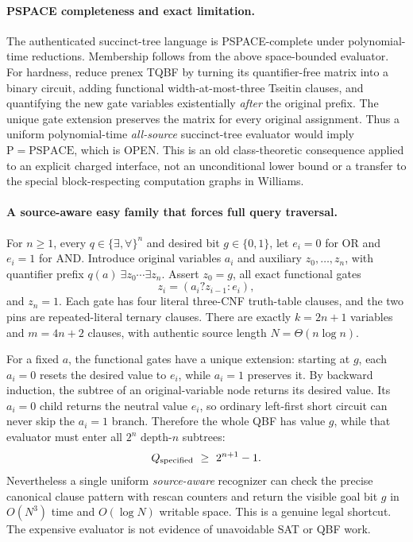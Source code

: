 \documentclass[11pt]{article}
\begin{document}
\paragraph{PSPACE completeness and exact limitation.}
The authenticated succinct-tree language is PSPACE-complete under
polynomial-time reductions. Membership follows from the above
space-bounded evaluator. For hardness, reduce prenex TQBF by turning
its quantifier-free matrix into a binary circuit, adding functional
width-at-most-three Tseitin clauses, and quantifying the new gate
variables existentially \emph{after} the original prefix. The unique
gate extension preserves the matrix for every original assignment.
Thus a uniform polynomial-time \emph{all-source} succinct-tree
evaluator would imply $\mathrm P=\mathrm{PSPACE}$, which is OPEN.
This is an old class-theoretic consequence applied to an explicit
charged interface, not an unconditional lower bound or a transfer
to the special block-respecting computation graphs in Williams.

\paragraph{A source-aware easy family that forces full query traversal.}
For $n\ge1$, every $q\in\{\exists,\forall\}^n$ and desired bit
$g\in\{0,1\}$, let $e_i=0$ for OR and $e_i=1$ for AND. Introduce
original variables $a_i$ and auxiliary $z_0,\ldots,z_n$, with
quantifier prefix $q(a)\ \exists z_0\cdots\exists z_n$.
Assert $z_0=g$, all exact functional gates
\[
  z_i=(a_i?z_{i-1}:e_i),
\]
and $z_n=1$. Each gate has four literal three-CNF truth-table
clauses, and the two pins are repeated-literal ternary clauses.
There are exactly $k=2n+1$ variables and $m=4n+2$ clauses, with
authentic source length $N=\Theta(n\log n)$.

For a fixed $a$, the functional gates have a unique extension:
starting at $g$, each $a_i=0$ resets the desired value to $e_i$,
while $a_i=1$ preserves it. By backward induction, the subtree
of an original-variable node returns its desired value.
Its $a_i=0$ child returns the neutral value $e_i$, so ordinary
left-first short circuit can never skip the $a_i=1$ branch.
Therefore the whole QBF has value $g$, while that evaluator
must enter all $2^n$ depth-$n$ subtrees:
\[
  Q_{\rm specified}\ \ge\ 2^{n+1}-1.
\]
Nevertheless a single uniform \emph{source-aware} recognizer can
check the precise canonical clause pattern with rescan counters
and return the visible goal bit $g$ in $O(N^3)$ time and
$O(\log N)$ writable space. This is a genuine legal shortcut.
The expensive evaluator is not evidence of unavoidable SAT or
QBF work.
\end{document}

